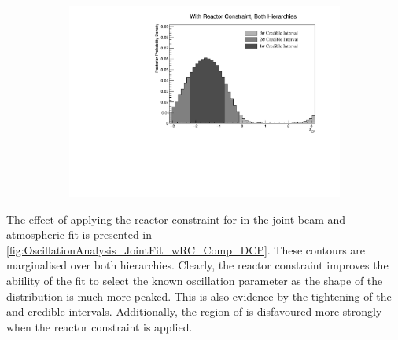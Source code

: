 \begin{figure}[h]
  \begin{subfigure}[t]{1.0\textwidth}
    \includegraphics[width=\textwidth, trim={0mm 0mm 0mm 0mm}, clip,page=1]{Figures/OA/JointFit_wRC/Contours_1D_dcp_BH_1_wRC_UnSmeared_CredibleInterval.pdf}
  \end{subfigure}
  \caption{}
  \label{fig:OscillationAnalysis_JointFit_wRC_DCP}
\end{figure}

The effect of applying the reactor constraint for  in the joint beam and atmospheric fit is presented in \autoref{fig:OscillationAnalysis_JointFit_wRC_Comp_DCP}. These contours are marginalised over both hierarchies. Clearly, the reactor constraint improves the abiility of the fit to select the known oscillation parameter as the shape of the distribution is much more peaked. This is also evidence by the tightening of the \quickmath{1\sigma} and  credible intervals. Additionally, the region of  is disfavoured more strongly when the reactor constraint is applied. 

